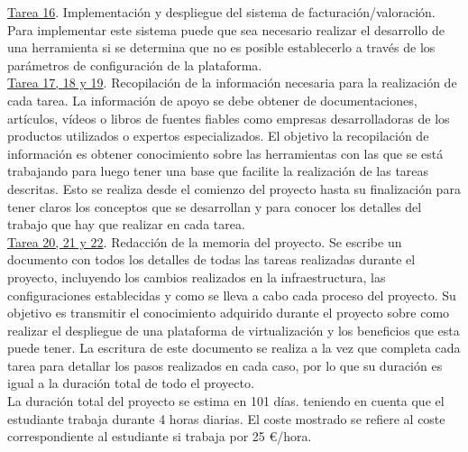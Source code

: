 \underline{Tarea 16}. Implementación y despliegue del sistema de facturación/valoración. Para implementar este sistema puede que sea necesario realizar el desarrollo de una herramienta si se determina que no es posible establecerlo a través de los parámetros de configuración de la plataforma. \\

\underline{Tarea 17, 18 y 19}. Recopilación de la información necesaria para la realización de cada tarea. La información de apoyo se debe obtener de documentaciones, artículos, vídeos o libros de  fuentes fiables como empresas desarrolladoras de los productos utilizados o expertos especializados. El objetivo la recopilación de información es obtener conocimiento sobre las herramientas con las que se está trabajando para luego tener una base que facilite la realización de las tareas descritas. Esto se realiza desde el comienzo del proyecto hasta su finalización para tener claros los conceptos que se desarrollan y para conocer los detalles del trabajo que hay que realizar en cada tarea.\\

\underline{Tarea 20, 21 y 22}. Redacción de la memoria del proyecto. Se escribe un documento con todos los detalles de todas las tareas realizadas durante el proyecto, incluyendo los cambios realizados en la infraestructura, las configuraciones establecidas y como se lleva a cabo cada proceso del proyecto. Su objetivo es transmitir el conocimiento adquirido durante el proyecto sobre como realizar el despliegue de una plataforma de virtualización y los beneficios que esta puede tener. La escritura de este documento se realiza a la vez que completa cada tarea para detallar los pasos realizados en cada caso, por lo que su duración es igual a la duración total de todo el proyecto.\\


La duración total del proyecto se estima en 101 días. teniendo en cuenta que el estudiante trabaja durante 4 horas diarias. El coste mostrado se refiere al coste correspondiente al estudiante si trabaja por 25 €/hora. 

